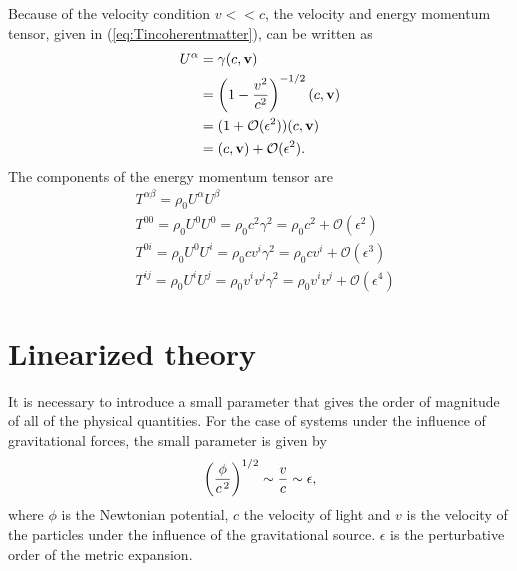 Because of the velocity condition $v<<c$, the velocity and energy momentum tensor, given in (\ref{eq:Tincoherentmatter}), can be written as
 \begin{align}
        U^{\alpha} &= \gamma(c, \textbf{v})\\
        \notag
        &=\left(1-\frac{v^2}{c^2}\right)^{-1/2}(c, \textbf{v})\\
          \notag
        &=(1+\mathcal{O}(\epsilon^2))(c, \textbf{v})\\
        &=(c, \textbf{v}) + \mathcal{O}(\epsilon^2).
    \end{align}
   The components of the energy momentum tensor are
   \begin{subequations}
   \label{eq: expansionenergymomentum}
 \begin{align}
 \label{eq: Tmnused}
        &T^{\alpha\beta}= \rho_0U^{\alpha}U^{\beta}  \\
         \label{eq: T00used}
        &T^{00}= \rho_0U^{0}U^{0}  =\rho_0 c^2 \gamma^2 = \rho_0 c^2 + \mathcal{O}(\epsilon^2)\\
         \label{eq: Toiused}
        &T^{0i}= \rho_0U^{0}U^{i}  =\rho_0 c v^i \gamma^2 = \rho_0 c v^i + \mathcal{O}(\epsilon^3)\\
         \label{eq: Tijused}
        &T^{ij}= \rho_0U^{i}U^{j}  =\rho_0 v^i v^j  \gamma^2 =\rho_0 v^i v^j+ \mathcal{O}(\epsilon^4)  
    \end{align}
 \end{subequations}
 
    
\section{Linearized theory}
It is necessary to introduce a small parameter that gives the order of magnitude of all of the physical quantities. For the case of systems under the influence of gravitational forces, the small parameter is given by
\begin{equation}
	 \left(\frac{\phi}{c^{\hspace{0.05cm}2}}\right)^{1/2} \sim \frac{v}{c} \sim \epsilon,
	\label{eq:epsilon_parameter}
\end{equation}
where $\phi$ is the Newtonian potential, $c$ the velocity of light and $v$ is the velocity of the particles under the influence of the gravitational source.  $\epsilon$ is the perturbative order of the metric expansion.\\


